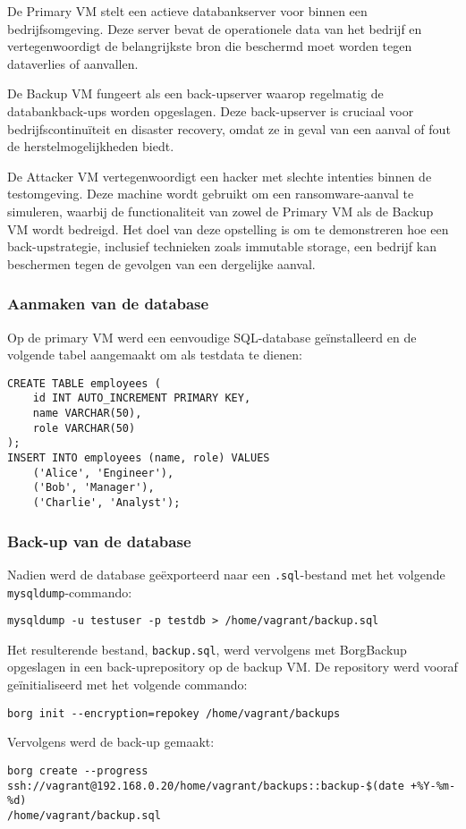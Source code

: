 De Primary VM stelt een actieve databankserver voor binnen een bedrijfsomgeving. Deze server bevat de operationele data van het bedrijf en vertegenwoordigt de belangrijkste bron die beschermd moet worden tegen dataverlies of aanvallen. 

De Backup VM fungeert als een back-upserver waarop regelmatig de databankback-ups worden opgeslagen. Deze back-upserver is cruciaal voor bedrijfscontinuïteit en disaster recovery, omdat ze in geval van een aanval of fout de herstelmogelijkheden biedt. 

De Attacker VM vertegenwoordigt een hacker met slechte intenties binnen de testomgeving. Deze machine wordt gebruikt om een ransomware-aanval te simuleren, waarbij de functionaliteit van zowel de Primary VM als de Backup VM wordt bedreigd. Het doel van deze opstelling is om te demonstreren hoe een back-upstrategie, inclusief technieken zoals immutable storage, een bedrijf kan beschermen tegen de gevolgen van een dergelijke aanval.

\subsubsection{Aanmaken van de database}
Op de primary VM werd een eenvoudige SQL-database geïnstalleerd en de volgende tabel aangemaakt om als testdata te dienen:
\begin{verbatim}
CREATE TABLE employees (
    id INT AUTO_INCREMENT PRIMARY KEY,
    name VARCHAR(50),
    role VARCHAR(50)
);
INSERT INTO employees (name, role) VALUES 
    ('Alice', 'Engineer'), 
    ('Bob', 'Manager'), 
    ('Charlie', 'Analyst');
\end{verbatim}

\newpage

\subsubsection{Back-up van de database}
Nadien werd de database geëxporteerd naar een \texttt{.sql}-bestand met het volgende \texttt{mysqldump}-commando:
\begin{verbatim}
mysqldump -u testuser -p testdb > /home/vagrant/backup.sql
\end{verbatim}
Het resulterende bestand, \texttt{backup.sql}, werd vervolgens met BorgBackup opgeslagen in een back-uprepository op de backup VM. De repository werd vooraf geïnitialiseerd met het volgende commando:
\begin{verbatim}
borg init --encryption=repokey /home/vagrant/backups
\end{verbatim}
Vervolgens werd de back-up gemaakt:
\begin{verbatim}
borg create --progress 
ssh://vagrant@192.168.0.20/home/vagrant/backups::backup-$(date +%Y-%m-%d) 
/home/vagrant/backup.sql
\end{verbatim}

